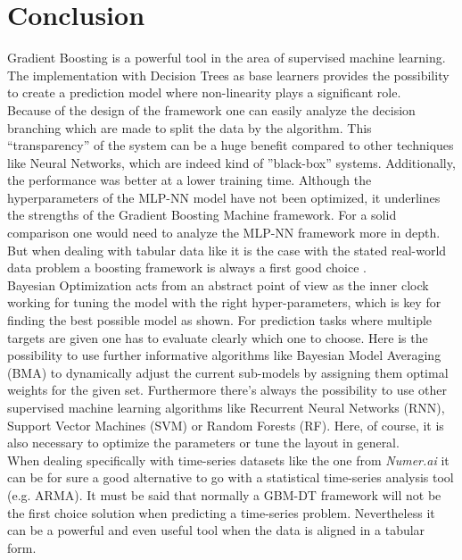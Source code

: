\documentclass[12pt, a4paper]{article}
\begin{document}
\section{Conclusion}
Gradient Boosting is a powerful tool in the area of supervised machine learning. The implementation with Decision Trees as base learners provides the possibility to create a prediction model where non-linearity plays a significant role. \\
Because of the design of the framework one can easily analyze the decision branching which are made to split the data by the algorithm. This ``transparency'' of the system can be a huge benefit compared to other techniques like Neural Networks, which are indeed kind of ''black-box'' systems. Additionally, the performance was better at a lower training time. Although the hyperparameters of the MLP-NN model have not been optimized, it underlines the strengths of the Gradient Boosting Machine framework. For a solid comparison one would need to analyze the MLP-NN framework more in depth. But when dealing with tabular data like it is the case with the stated real-world data problem a boosting framework is always a first good choice \cite{McElfresh2023}. \\
Bayesian Optimization acts from an abstract point of view as the inner clock working for tuning the model with the right hyper-parameters, which is key for finding the best possible model as shown. For prediction tasks where multiple targets are given one has to evaluate clearly which one to choose. Here is the possibility to use further informative algorithms like Bayesian Model Averaging (BMA) to dynamically adjust the current sub-models by assigning them optimal weights for the given set. Furthermore there's always the possibility to use other supervised machine learning algorithms like Recurrent Neural Networks (RNN), Support Vector Machines (SVM) or Random Forests (RF).
Here, of course, it is also necessary to optimize the parameters or tune the layout in general.\\
When dealing specifically with time-series datasets like the one from \textit{Numer.ai} it can be for sure a good alternative to go with a statistical time-series analysis tool (e.g. ARMA). It must be said that normally a GBM-DT framework will not be the first choice solution when predicting a time-series problem. Nevertheless it can be a powerful and even useful tool when the data is aligned in a tabular form. \\
\end{document}
